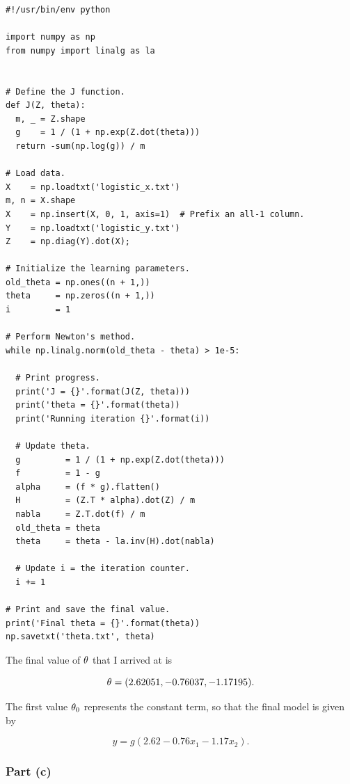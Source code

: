 \documentclass[]{article}
\begin{document}
\begin{verbatim}
#!/usr/bin/env python

import numpy as np
from numpy import linalg as la


# Define the J function.
def J(Z, theta):
  m, _ = Z.shape
  g    = 1 / (1 + np.exp(Z.dot(theta)))
  return -sum(np.log(g)) / m

# Load data.
X    = np.loadtxt('logistic_x.txt')
m, n = X.shape
X    = np.insert(X, 0, 1, axis=1)  # Prefix an all-1 column.
Y    = np.loadtxt('logistic_y.txt')
Z    = np.diag(Y).dot(X);

# Initialize the learning parameters.
old_theta = np.ones((n + 1,))
theta     = np.zeros((n + 1,))
i         = 1

# Perform Newton's method.
while np.linalg.norm(old_theta - theta) > 1e-5:

  # Print progress.
  print('J = {}'.format(J(Z, theta)))
  print('theta = {}'.format(theta))
  print('Running iteration {}'.format(i))

  # Update theta.
  g         = 1 / (1 + np.exp(Z.dot(theta)))
  f         = 1 - g
  alpha     = (f * g).flatten()
  H         = (Z.T * alpha).dot(Z) / m
  nabla     = Z.T.dot(f) / m
  old_theta = theta
  theta     = theta - la.inv(H).dot(nabla)

  # Update i = the iteration counter.
  i += 1

# Print and save the final value.
print('Final theta = {}'.format(theta))
np.savetxt('theta.txt', theta)
\end{verbatim}

The final value of \(\theta\) that I arrived at is

\[\theta = (2.62051, -0.76037, -1.17195).\]

The first value \(\theta_0\) represents the constant term, so that the
final model is given by

\[y = g(2.62 - 0.76x_1 - 1.17x_2).\]

\subsubsection{Part (c)}\label{part-c}
\end{document}
